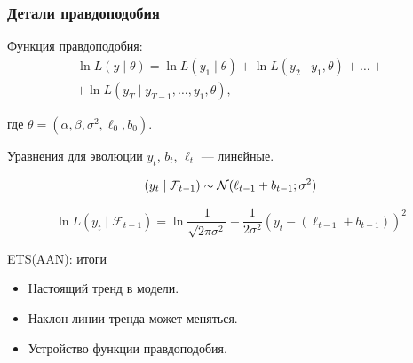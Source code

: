 \begin{frame}
  \frametitle{Детали правдоподобия}
  \alert{Функция правдоподобия}:
  \begin{multline*}
    \ln L(y \mid \theta) = \ln L(y_1 \mid \theta) + \ln L(y_2 \mid y_1, \theta) + \ldots + \\
     + \ln L(y_T \mid y_{T-1}, \ldots, y_1, \theta),
  \end{multline*}

  где $\theta = (\alpha, \beta, \sigma^2, \ell_0, b_0)$.

  \pause
  Уравнения для эволюции $y_t$, $b_t$, $\ell_t$ — \alert{линейные}.
  
  \pause
  \[
  (y_t \mid \mathcal F_{t-1}) \sim \mathcal{N}(\ell_{t-1} + b_{t-1}; \sigma^2)
  \]

  \pause
  \[
  \ln L(y_t \mid \mathcal F_{t-1}) = 
  \ln \frac{1}{\sqrt{2\pi \sigma^2}} - \frac{1}{2\sigma^2} (y_t - (\ell_{t-1} + b_{t-1}))^2
  \]

\end{frame}


\begin{frame}{ETS(AAN): итоги}

  \begin{itemize}[<+->]
    \item Настоящий \alert{тренд в модели}. 
    \item Наклон линии тренда может меняться.
    \item Устройство функции правдоподобия.
  \end{itemize}
\end{frame}




